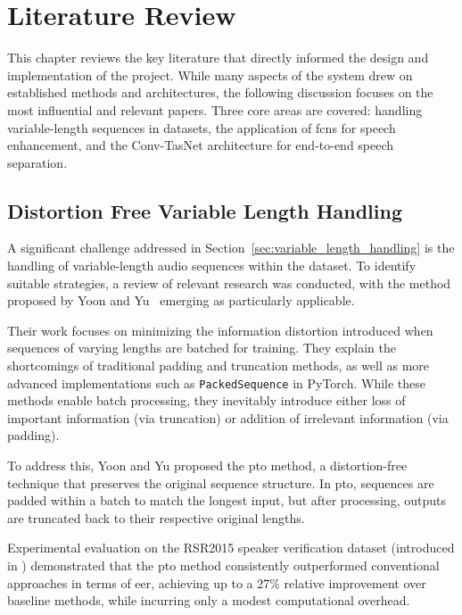 \graphicspath{{content/chapters/3_literature/figures/}}
\chapter{Literature Review}
\label{chp:literature_review}

This chapter reviews the key literature that directly informed the design and implementation of the project. While many aspects of the system drew on established methods and architectures, the following discussion focuses on the most influential and relevant papers. Three core areas are covered: handling variable-length sequences in datasets, the application of \gls{fcn}s for speech enhancement, and the Conv-TasNet architecture for end-to-end speech separation.

\section{Distortion Free Variable Length Handling} 
\label{sec:distortion_free_handling}

A significant challenge addressed in Section~\ref{sec:variable_length_handling} is the handling of variable-length audio sequences within the dataset. To identify suitable strategies, a review of relevant research was conducted, with the method proposed by Yoon and Yu~\cite{yoon2020pto} emerging as particularly applicable.

Their work focuses on minimizing the information distortion introduced when sequences of varying lengths are batched for training. They explain the shortcomings of traditional padding and truncation methods, as well as more advanced implementations such as \texttt{PackedSequence} in PyTorch. While these methods enable batch processing, they inevitably introduce either loss of important information (via truncation) or addition of irrelevant information (via padding).

To address this, Yoon and Yu proposed the \gls{pto} method, a distortion-free technique that preserves the original sequence structure. In \gls{pto}, sequences are padded within a batch to match the longest input, but after processing, outputs are truncated back to their respective original lengths.

Experimental evaluation on the RSR2015 speaker verification dataset (introduced in \cite{larcher2014text}) demonstrated that the \gls{pto} method consistently outperformed conventional approaches in terms of \gls{eer}, achieving up to a 27\% relative improvement over baseline methods, while incurring only a modest computational overhead.

